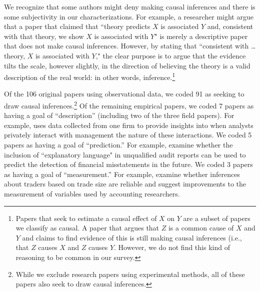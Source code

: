 \documentclass[11pt,reqno,titlepage]{amsart}
\begin{document}
\begin{doublespace}
We recognize that some authors might deny making causal inferences and there is some subjectivity in our characterizations.
For example, a researcher might argue that a paper that claimed that ``theory predicts $X$ is associated $Y$ and, consistent with that theory, we show $X$ is associated with $Y$" is merely a descriptive paper that does not make causal inferences.
However, by stating that ``consistent with \dots theory, $X$ is associated with $Y$," the clear purpose is to argue that the evidence tilts the scale, however slightly, in the direction of believing the theory is a valid description of the real world: in other words, inference.\footnote{
Papers that seek to estimate a causal effect of $X$ on $Y$ are a subset of papers we classify as causal.
A paper that argues that $Z$ is a common cause of $X$ and $Y$ and claims to find evidence of this is still making causal inferences (i.e., that $Z$ causes $X$ and $Z$ causes $Y$.
However, we do not find this kind of reasoning to be common in our survey.}

Of the 106 original papers using observational data, we coded 91 as seeking to draw causal inferences.\footnote{While we exclude research papers using experimental methods, all of these papers also seek to draw causal inferences.}
Of the remaining empirical papers, we coded 7 papers as having a goal of ``description'' (including two of the three field papers). 
For example, \citet{Soltes:2013ba} uses data collected from one firm to provide insights into when analysts privately interact with management the nature of these interactions.
We coded 5 papers as having a goal of ``prediction.'' 
For example, \citet{Czerney:2014bv} examine whether the inclusion of ``explanatory language" in unqualified audit reports can be used to predict the detection of financial misstatements in the future.
We coded 3 papers as having a goal of ``measurement.'' 
For example, \citet{Cready:2014ji} examine whether inferences about traders based on trade size are reliable and suggest improvements to the measurement of variables used by accounting researchers.


\end{doublespace}
\end{document}
